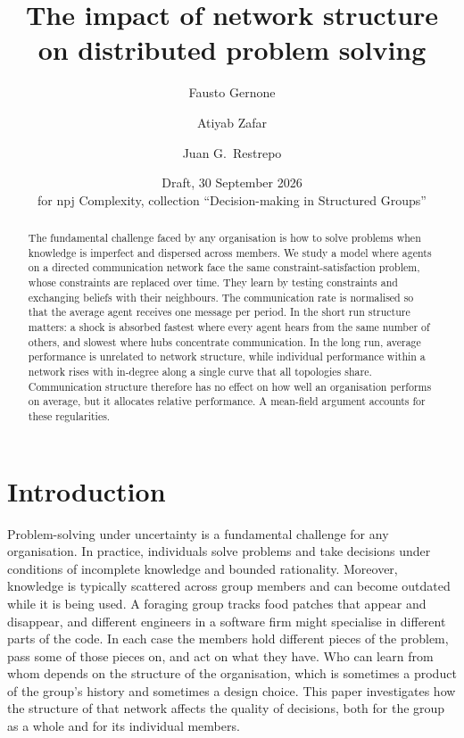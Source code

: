\documentclass[11pt]{article}
\title{The impact of network structure on distributed problem solving}
\author{Fausto Gernone \and Atiyab Zafar \and Juan G.\ Restrepo}
\date{Draft, 30 September 2026\\ \small for npj Complexity, collection ``Decision-making in Structured Groups''}
\begin{document}
\maketitle


\begin{abstract}
The fundamental challenge faced by any organisation is how to solve problems when knowledge is imperfect and dispersed across members. We study a model where agents on a directed communication network face the same constraint-satisfaction problem, whose constraints are replaced over time. They learn by testing constraints and exchanging beliefs with their neighbours. The communication rate is normalised so that the average agent receives one message per period. In the short run structure matters: a shock is absorbed fastest where every agent hears from the same number of others, and slowest where hubs concentrate communication. In the long run, average performance is unrelated to network structure, while individual performance within a network rises with in-degree along a single curve that all topologies share. Communication structure therefore has no effect on how well an organisation performs on average, but it allocates relative performance. A mean-field argument accounts for these regularities.
\end{abstract}


\section{Introduction}\label{sec:intro}

Problem-solving under uncertainty is a fundamental challenge for any organisation. In practice, individuals solve problems and take decisions under conditions of incomplete knowledge and bounded rationality. Moreover, knowledge is typically scattered across group members and can become outdated while it is being used. A foraging group tracks food patches that appear and disappear, and different engineers in a software firm might specialise in different parts of the code. In each case the members hold different pieces of the problem, pass some of those pieces on, and act on what they have. Who can learn from whom depends on the structure of the organisation, which is sometimes a product of the group's history and sometimes a design choice. This paper investigates how the structure of that network affects the quality of decisions, both for the group as a whole and for its individual members.
\end{document}
